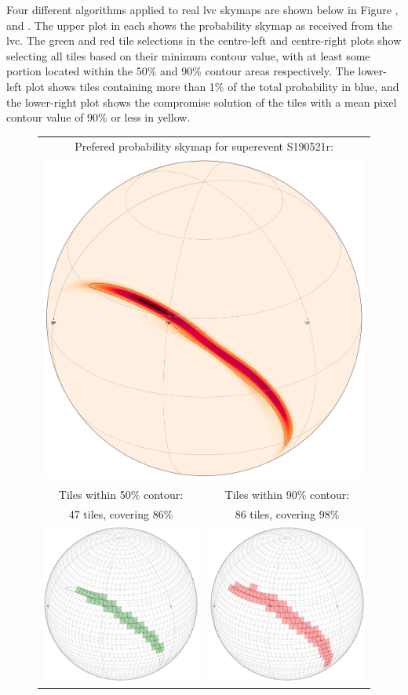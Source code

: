 \begin{colsection}
\begin{colsection}
Four different algorithms applied to real \gls{lvc} skymaps are shown below in Figure ,  and . The upper plot in each shows the probability skymap as received from the \gls{lvc}. The green and red tile selections in the centre-left and centre-right plots show selecting all tiles based on their minimum contour value, with at least some portion located within the 50\% and 90\% contour areas respectively. The lower-left plot shows tiles containing more than 1\% of the total probability in blue, and the lower-right plot shows the compromise solution of the tiles with a mean pixel contour value of 90\% or less in yellow.

\newpage

\begin{figure}[p]
    \begin{center}
        \begin{tabular}{cc}
            \multicolumn{2}{c}{Prefered probability skymap for superevent S190521r:} \\
            \multicolumn{2}{c}{\includegraphics[width=0.5\linewidth]{images/tiling/1_0.png}} \\
            Tiles within 50\% contour: &
            Tiles within 90\% contour: \\
            47 tiles, covering 86\% &
            86 tiles, covering 98\% \\
            \includegraphics[width=0.25\linewidth]{images/tiling/1_c.png} &
            \includegraphics[width=0.25\linewidth]{images/tiling/1_d.png} \\

\end{tabular}
\end{center}
\end{figure}
\end{colsection}
\end{colsection}
